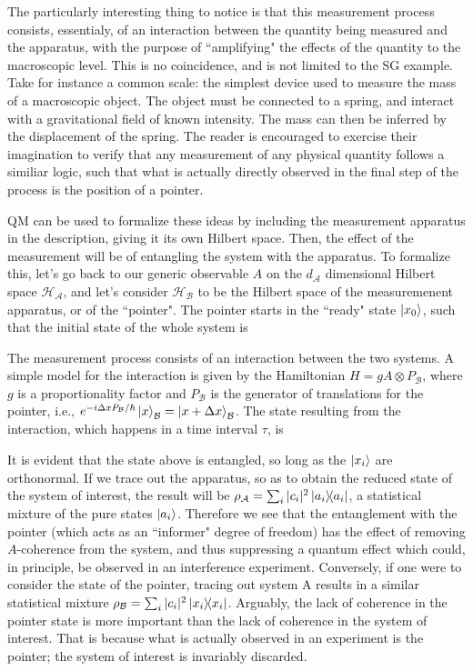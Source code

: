 \documentclass[12pt,a4paper,notitlepage]{report}
\begin{document}
The particularly interesting thing to notice is that this measurement process consists, essentialy, of an interaction between the quantity being measured and the apparatus, with the purpose of ``amplifying" the effects of the quantity to the macroscopic level. This is no coincidence, and is not limited to the SG example. Take for instance a common scale: the simplest device used to measure the mass of a macroscopic object. The object must be connected to a spring, and interact with a gravitational field of known intensity. The mass can then be inferred by the displacement of the spring. The reader is encouraged to exercise their imagination to verify that any measurement of any physical quantity follows a similiar logic, such that what is actually directly observed in the final step of the process is the position of a pointer.

QM can be used to formalize these ideas by including the measurement apparatus in the description, giving it its own Hilbert space. Then, the effect of the measurement will be of entangling the system with the apparatus. To formalize this, let's go back to our generic observable $A$ on the $d_{\mathcal{A}}$ dimensional Hilbert space $\mathcal{H}_{\mathcal{A}}$, and let's consider $\mathcal{H}_{\mathcal{B}}$ to be the Hilbert space of the measuremenent apparatus, or of the ``pointer". The pointer starts in the ``ready" state $\ket{x_0}$, such that the initial state of the whole system is

%
The measurement process consists of an interaction between the two systems. A simple model for the interaction is given by the Hamiltonian $H = g A \otimes P_{\mathcal{B}}$, where $g$ is a proportionality factor and $P_{\mathcal{B}}$ is the generator of translations for the pointer, i.e., $e^{-i\Delta x P_{\mathcal{B}}/\hbar}\ket{x}_\mathcal{B} = \ket{x + \Delta x}_\mathcal{B}$. The state resulting from the interaction, which happens in a time interval $\tau$, is

%
It is evident that the state above is entangled, so long as the $\ket{x_i}$ are orthonormal. If we trace out the apparatus, so as to obtain the reduced state of the system of interest, the result will be $\rho_{\mathcal{A}} = \sum_i |c_i|^2 \dyad{a_i}$, a statistical mixture of the pure states $\ket{a_i}$. Therefore we see that the entanglement with the pointer (which acts as an ``informer" degree of freedom) has the effect of removing $A$-coherence from the system, and thus suppressing a quantum effect which could, in principle, be observed in an interference experiment. Conversely, if one were to consider the state of the pointer, tracing out system A results in a similar statistical mixture $\rho_{\mathcal{B}} = \sum_i |c_i|^2 \dyad{x_i}$. Arguably, the lack of coherence in the pointer state is more important than the lack of coherence in the system of interest. That is because what is actually observed in an experiment is the pointer; the system of interest is invariably discarded.
\end{document}
